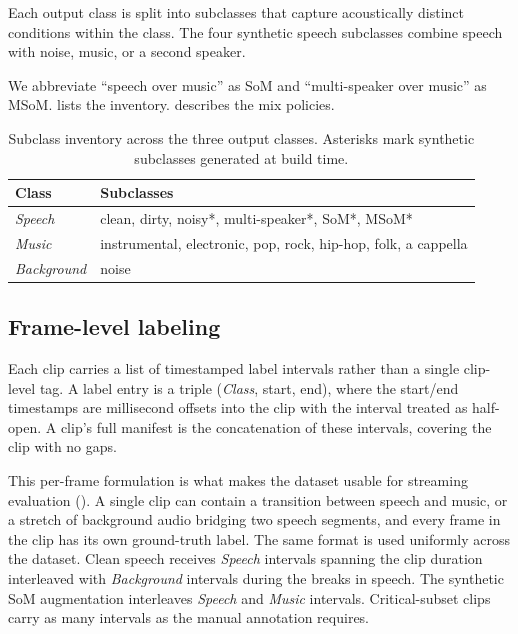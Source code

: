 Each output class is split into subclasses that capture acoustically distinct conditions within the class.
The four synthetic speech subclasses combine speech with noise, music, or a second speaker.

We abbreviate ``speech over music'' as SoM and ``multi-speaker over music'' as MSoM.
 lists the inventory.
 describes the mix policies.

\begin{table}[h]
\centering
\begin{tabular}{ll}
\toprule
\textbf{Class} & \textbf{Subclasses} \\
\midrule
\emph{Speech}   & clean, dirty, noisy*, multi-speaker*, SoM*, MSoM* \\
\emph{Music}    & instrumental, electronic, pop, rock, hip-hop, folk, a cappella \\
\emph{Background} & noise \\
\bottomrule
\end{tabular}
\caption{Subclass inventory across the three output classes.
Asterisks mark synthetic subclasses generated at build time.}
\label{tab:dataset_subclass_inventory}
\end{table}

\subsection{Frame-level labeling}
\label{sec:dataset_labeling}

Each clip carries a list of timestamped label intervals rather than a single clip-level tag.
A label entry is a triple (\emph{Class}, start, end), where the start/end timestamps are millisecond offsets into the clip with the interval treated as half-open.
A clip's full manifest is the concatenation of these intervals, covering the clip with no gaps.

This per-frame formulation is what makes the dataset usable for streaming evaluation ().
A single clip can contain a transition between speech and music, or a stretch of background audio bridging two speech segments, and every frame in the clip has its own ground-truth label.
The same format is used uniformly across the dataset.
Clean speech receives \emph{Speech} intervals spanning the clip duration interleaved with \emph{Background} intervals during the breaks in speech.
The synthetic SoM augmentation interleaves \emph{Speech} and \emph{Music} intervals.
Critical-subset clips carry as many intervals as the manual annotation requires.

